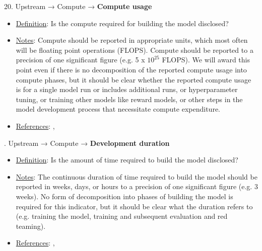 20. Upstream → Compute → \textbf{Compute usage}
\vspace{-\parskip}
\begin{itemize}
	\item
	\underline{Definition}: Is the compute required for building the model disclosed?
	\item
	\underline{Notes}: Compute should be reported in appropriate units, which most often will be floating point operations (FLOPS). Compute should be reported to a precision of one significant figure (e.g. 5 x $10^{25}$ FLOPS). We will award this point even if there is no decomposition of the reported compute usage into compute phases, but it should be clear whether the reported compute usage is for a single model run or includes additional runs, or hyperparameter tuning, or training other models like reward models, or other steps in the model development process that necessitate compute expenditure.
	\item
	\underline{References}: \citet{henderson2020towards}, \citet{strubell2019energy}
\end{itemize} \vspace{\baselineskip}


. Upstream → Compute → \textbf{Development duration}
\vspace{-\parskip}
\begin{itemize}
	\item
	\underline{Definition}: Is the amount of time required to build the model disclosed?
	\item
	\underline{Notes}: The continuous duration of time required to build the model should be reported in weeks, days, or hours to a precision of one significant figure (e.g. 3 weeks). No form of decomposition into phases of building the model is required for this indicator, but it should be clear what the duration refers to (e.g. training the model, training and subsequent evaluation and red teaming).
	\item
	\underline{References}: \citet{sevilla2022compute}, \citet{hoffmann2022training}
\end{itemize} \vspace{\baselineskip}


